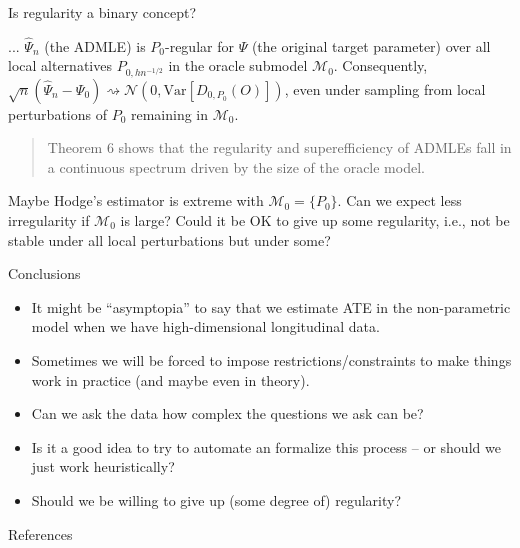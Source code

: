 \documentclass[smaller]{beamer}\usepackage{listings}
\newcommand{\1}{\mathds{1}}
\newcommand{\V}{\mathrm{Var}} %
\begin{document}
\begin{frame}[label={sec:org59729cc}]{Is regularity a binary concept?}
\begin{theorem}[Theorem 6]

... $\hat{\Psi}_n$ (the ADMLE) is \( P_0 \)-regular for $\Psi$ (the original
target parameter) over all local alternatives \( P_{0,h n^{-1/2}} \) in the
oracle submodel \( \mathcal{M}_0 \). Consequently,
\( \sqrt{n}(\hat{\Psi}_n-\Psi_0) \rightsquigarrow \mathcal{N}(0,
\V{[D_{0,P_0}(O)]}) \), even under sampling from local perturbations of
\( P_0 \) remaining in \( \mathcal{M}_0 \).

\hfill
\end{theorem}

\begin{quote} %
Theorem 6 shows that the regularity and superefficiency of ADMLEs fall in a
continuous spectrum driven by the size of the oracle model.

\flushright \cite{van2023adaptive}
\end{quote}

\begin{block}{}
Maybe Hodge's estimator is extreme with \(\mathcal{M}_0 = \{P_0\}\). Can we
expect less irregularity if \(\mathcal{M}_0\) is large? Could it be OK to give
up some regularity, i.e., not be stable under all local perturbations but under
some?
\end{block}
\end{frame}


\begin{frame}[label={sec:org7986a3d}]{Conclusions}
\begin{itemize}
\item It might be ``asymptopia'' to say that we estimate ATE in the non-parametric
model when we have high-dimensional longitudinal data.
\item Sometimes we will be forced to impose restrictions/constraints to make things
work in practice (and maybe even in theory).
\item Can we ask the data how complex the questions we ask can be?
\item Is it a good idea to try to automate an formalize this process -- or should we
just work heuristically?
\item Should we be willing to give up (some degree of) regularity?
\end{itemize}
\end{frame}


\begin{frame}[label={sec:orgbd24ed4}]{References}
\footnotesize 
\end{frame}
\end{document}
